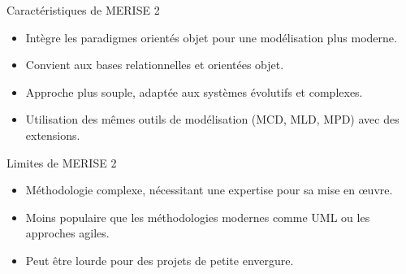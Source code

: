 \documentclass{beamer}
\begin{document}
\begin{frame}{Caractéristiques de MERISE 2}
\begin{itemize}
    \item Intègre les paradigmes orientés objet pour une modélisation plus moderne.
    \item Convient aux bases relationnelles et orientées objet.
    \item Approche plus souple, adaptée aux systèmes évolutifs et complexes.
    \item Utilisation des mêmes outils de modélisation (MCD, MLD, MPD) avec des extensions.
\end{itemize}
\end{frame}

\begin{frame}{Limites de MERISE 2}
\begin{itemize}
    \item Méthodologie complexe, nécessitant une expertise pour sa mise en œuvre.
    \item Moins populaire que les méthodologies modernes comme UML ou les approches agiles.
    \item Peut être lourde pour des projets de petite envergure.
\end{itemize}
\end{frame}
\end{document}
